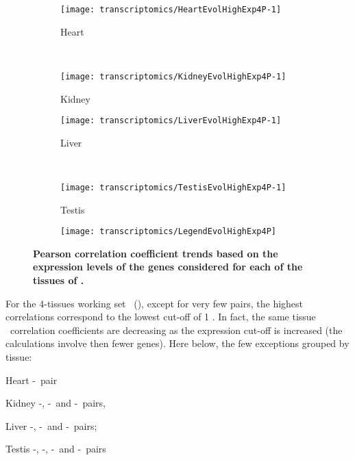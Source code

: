 \begin{sidewaysfigure}[!htpb]
    \centering
    \begin{subfigure}[b]{0.48\textwidth}\centering
        \texttt{[image: transcriptomics/HeartEvolHighExp4P-1]}
        \caption{Heart}\label{fig:CorHighExpHeart4T}
    \end{subfigure}%
~%
    \begin{subfigure}[b]{0.48\textwidth}\centering
        \texttt{[image: transcriptomics/KidneyEvolHighExp4P-1]}
        \caption{Kidney}\label{fig:CorHighExpKidney4T}
    \end{subfigure}

    \begin{subfigure}[b]{0.48\textwidth}\centering
        \texttt{[image: transcriptomics/LiverEvolHighExp4P-1]}
        \caption{Liver}\label{fig:CorHighExpLiver4T}
    \end{subfigure}%
~%
    \begin{subfigure}[b]{0.48\textwidth}\centering
        \texttt{[image: transcriptomics/TestisEvolHighExp4P-1]}
        \caption{Testis}\label{fig:CorHighExpTestis4T}
    \end{subfigure}
    \begin{subfigure}[b]{\textwidth}\centering
        \texttt{[image: transcriptomics/LegendEvolHighExp4P]}
    \end{subfigure}
    \caption[Pearson correlation coefficient trends based on the expression
    levels of the genes considered for \setOne]{%
\label{fig:CorHighExp4T}\textbf{Pearson correlation coefficient trends
    based on the expression levels of the genes considered for each of the tissues
    of \setOne.}}
\end{sidewaysfigure}

For the 4-tissues working set \setOne\ (),
except for very few pairs, the highest correlations correspond to
the lowest cut-off of 1 \FPKM\@.
In fact, the same tissue \trep\ correlation coefficients
are decreasing as the expression cut-off is increased
(the calculations involve then fewer genes).
Here below, the few exceptions grouped by tissue:\mybr\
\begin{eqlist}[\eqliststarinit\def\makelabel#1{\bfseries#1}\labelsep1em]
\item[Heart] \uhlen{}-\gtex\ pair
\item[Kidney] \uhlen{}-\gtex, \castle{}-\uhlen\ and \castle{}-\gtex\ pairs,
\item[Liver]  \vt{}-\ibm, \ibm{}-\uhlen\ and \ibm{}-\uhlen\ pairs;
\item[Testis] \ibm{}-\uhlen, \vt{}-\gtex, \vt{}-\uhlen\ and \uhlen{}-\gtex\ pairs
\end{eqlist}


